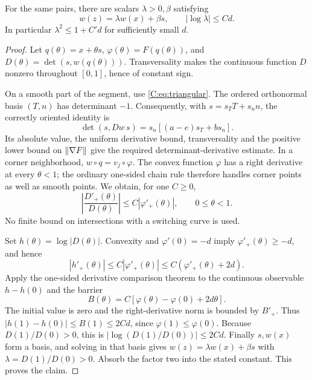 \begin{lemma}\label{C:lem:transport}
For the same pairs, there are scalars $\lambda>0,\beta$ satisfying
\begin{equation}\label{C:eq:transport}
 w(z)=\lambda w(x)+\beta s,\qquad
 |\log\lambda|\le C d.
\end{equation}
In particular $\lambda^2\le1+C'd$ for sufficiently small $d$.
\end{lemma}
\begin{proof}
Let $q(\theta)=x+\theta s$, $\varphi(\theta)=F(q(\theta))$, and $D(\theta)=\det(s,w(q(\theta)))$. Transversality makes the continuous function $D$ nonzero throughout $[0,1]$, hence of constant sign.

On a smooth part of the segment, use \eqref{C:eq:triangular}. The ordered orthonormal basis $(T,n)$ has determinant $-1$. Consequently, with $s=s_TT+s_n n$, the correctly oriented identity is
\[
 \det(s,Dw\,s)=s_n[(a-e)s_T+b s_n].
\]
Its absolute value, the uniform derivative bound, transversality and the positive lower bound on $\lVert \nabla F\rVert$ give the required determinant-derivative estimate. In a corner neighborhood, $w\circ q=v_j\circ\varphi$. The convex function $\varphi$ has a right derivative at every $\theta<1$; the ordinary one-sided chain rule therefore handles corner points as well as smooth points. We obtain, for one $C\ge0$,
\[
 \left|\frac{D'_+(\theta)}{D(\theta)}\right|
 \le C|\varphi'_+(\theta)|,\qquad 0\le\theta<1.
\]
No finite bound on intersections with a switching curve is used.

Set $h(\theta)=\log|D(\theta)|$. Convexity and $\varphi'(0)=-d$ imply $\varphi'_+(\theta)\ge-d$, and hence
\begin{equation}\label{C:eq:variation}
 |h'_+(\theta)|\le C|\varphi'_+(\theta)|
 \le C(\varphi'_+(\theta)+2d).
\end{equation}
Apply the one-sided derivative comparison theorem to the continuous observable $h-h(0)$ and the barrier
\[
 B(\theta)=C[\varphi(\theta)-\varphi(0)+2d\theta].
\]
The initial value is zero and the right-derivative norm is bounded by $B'_+$. Thus $|h(1)-h(0)|\le B(1)\le2Cd$, since $\varphi(1)\le\varphi(0)$. Because $D(1)/D(0)>0$, this is $|\log(D(1)/D(0))|\le2Cd$. Finally $s,w(x)$ form a basis, and solving in that basis gives $w(z)=\lambda w(x)+\beta s$ with $\lambda=D(1)/D(0)>0$. Absorb the factor two into the stated constant. This proves the claim.
\end{proof}

